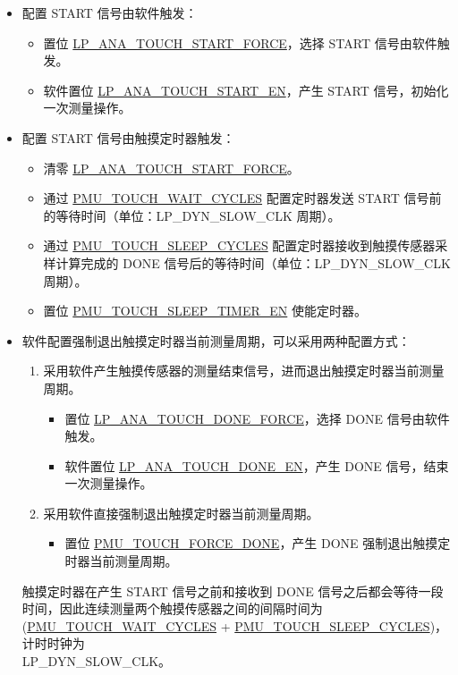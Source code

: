 \documentclass[main\_\_CN.tex]{subfiles}
\begin{document}
\begin{itemize}
    \item 配置 START 信号由软件触发：
    \begin{itemize}
        \item 置位 \hyperref[fielddesc:LPANATOUCHSTARTFORCE]{LP\_ANA\_TOUCH\_START\_FORCE}，选择 START 信号由软件触发。
        \item 软件置位 \hyperref[fielddesc:LPANATOUCHSTARTEN]{LP\_ANA\_TOUCH\_START\_EN}，产生 START 信号，初始化一次测量操作。
    \end{itemize}
    \item 配置 START 信号由触摸定时器触发：
    \begin{itemize}
        \item 清零 \hyperref[fielddesc:LPANATOUCHSTARTFORCE]{LP\_ANA\_TOUCH\_START\_FORCE}。
        \item 通过 \hyperref[fielddesc:PMUTOUCHWAITCYCLES]{PMU\_TOUCH\_WAIT\_CYCLES} 配置定时器发送 START 信号前的等待时间（单位：LP\_DYN\_SLOW\_CLK 周期）。
        \item 通过 \hyperref[fielddesc:PMUTOUCHSLEEPCYCLES]{PMU\_TOUCH\_SLEEP\_CYCLES} 配置定时器接收到触摸传感器采样计算完成的 DONE 信号后的等待时间（单位：LP\_DYN\_SLOW\_CLK 周期）。
        \item 置位 \hyperref[fielddesc:PMUTOUCHSLEEPTIMEREN]{PMU\_TOUCH\_SLEEP\_TIMER\_EN} 使能定时器。
    \end{itemize}
    \item 软件配置强制退出触摸定时器当前测量周期，可以采用两种配置方式：
    \begin{enumerate}
        \item 采用软件产生触摸传感器的测量结束信号，进而退出触摸定时器当前测量周期。
        \begin{itemize}
            \item 置位 \hyperref[fielddesc:LPANATOUCHDONEFORCE]{LP\_ANA\_TOUCH\_DONE\_FORCE}，选择 DONE 信号由软件触发。
            \item 软件置位 \hyperref[fielddesc:LPANATOUCHDONEEN]{LP\_ANA\_TOUCH\_DONE\_EN}，产生 DONE 信号，结束一次测量操作。
        \end{itemize}
        \item 采用软件直接强制退出触摸定时器当前测量周期。
        \begin{itemize}
            \item 置位 \hyperref[fielddesc:PMUTOUCHFORCEDONE]{PMU\_TOUCH\_FORCE\_DONE}，产生 DONE 强制退出触摸定时器当前测量周期。
        \end{itemize}
    \end{enumerate}

\begin{tiplisting}
触摸定时器在产生 START 信号之前和接收到 DONE 信号之后都会等待一段时间，因此连续测量两个触摸传感器之间的间隔时间为 (\hyperref[fielddesc:PMUTOUCHWAITCYCLES]{PMU\_TOUCH\_WAIT\_CYCLES} + \hyperref[fielddesc:PMUTOUCHSLEEPCYCLES]{PMU\_TOUCH\_SLEEP\_CYCLES})，计时时钟为\\ LP\_DYN\_SLOW\_CLK。
\end{tiplisting}
\end{itemize}
\end{document}
